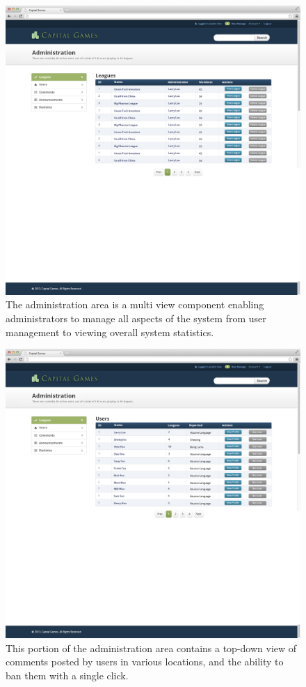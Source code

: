 \begin{figure}
\centering
\includegraphics[width=5.5in]{./mockups/JPEG/adminleagues.jpg}
\caption{The administration area is a multi view component enabling administrators to manage all aspects of the system from user management to viewing overall system statistics.}
\end{figure}

\begin{figure}
\centering
\includegraphics[width=5.5in]{./mockups/JPEG/adminusers.jpg}
\caption{This portion of the administration area contains a top-down view of comments posted by users in various locations, and the ability to ban them with a single click.}
\end{figure}

